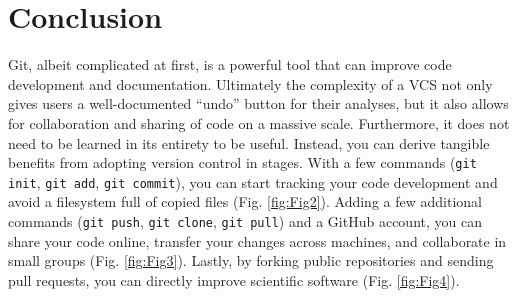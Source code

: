 \section*{Conclusion}

Git, albeit complicated at first, is a powerful tool that can improve code development and documentation.
Ultimately the complexity of a VCS not only gives users a well-documented ``undo'' button for their analyses, but it also allows for collaboration and sharing of code on a massive scale.
Furthermore, it does not need to be learned in its entirety to be useful.
Instead, you can derive tangible benefits from adopting version control in stages.
With a few commands (\verb|git init|, \verb|git add|, \verb|git commit|), you can start tracking your code development and avoid a filesystem full of copied files (Fig. \ref{fig:Fig2}).
Adding a few additional commands (\verb|git push|, \verb|git clone|, \verb|git pull|) and a GitHub account, you can share your code online, transfer your changes across machines, and collaborate in small groups (Fig. \ref{fig:Fig3}).
Lastly, by forking public repositories and sending pull requests, you can directly improve scientific software (Fig. \ref{fig:Fig4}).
